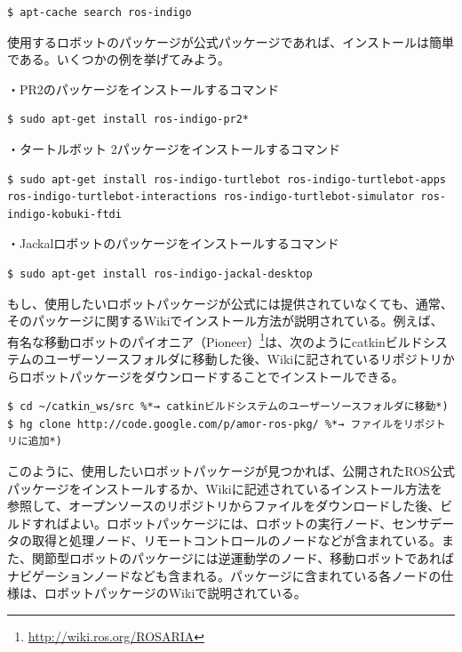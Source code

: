 \begin{lstlisting}[language=ROS]
$ apt-cache search ros-indigo
\end{lstlisting}

使用するロボットのパッケージが公式パッケージであれば、インストールは簡単である。いくつかの例を挙げてみよう。
\vspace{\baselineskip}

・PR2のパッケージをインストールするコマンド
\begin{lstlisting}[language=ROS]
$ sudo apt-get install ros-indigo-pr2*
\end{lstlisting}

・タートルボット 2パッケージをインストールするコマンド
\begin{lstlisting}[language=ROS]
$ sudo apt-get install ros-indigo-turtlebot ros-indigo-turtlebot-apps ros-indigo-turtlebot-interactions ros-indigo-turtlebot-simulator ros-indigo-kobuki-ftdi
\end{lstlisting}

・Jackalロボットのパッケージをインストールするコマンド
\begin{lstlisting}[language=ROS]
$ sudo apt-get install ros-indigo-jackal-desktop
\end{lstlisting}

もし、使用したいロボットパッケージが公式には提供されていなくても、通常、そのパッケージに関するWikiでインストール方法が説明されている。例えば、有名な移動ロボットのパイオニア（Pioneer）\footnote{\url{http://wiki.ros.org/ROSARIA}}は、次のようにcatkinビルドシステムのユーザーソースフォルダに移動した後、Wikiに記されているリポジトリからロボットパッケージをダウンロードすることでインストールできる。

\begin{lstlisting}[language=ROS]
$ cd ~/catkin_ws/src %*→ catkinビルドシステムのユーザーソースフォルダに移動*)
$ hg clone http://code.google.com/p/amor-ros-pkg/ %*→ ファイルをリポジトリに追加*)
\end{lstlisting}

このように、使用したいロボットパッケージが見つかれば、公開されたROS公式パッケージをインストールするか、Wikiに記述されているインストール方法を参照して、オープンソースのリポジトリからファイルをダウンロードした後、ビルドすればよい。ロボットパッケージには、ロボットの実行ノード、センサデータの取得と処理ノード、リモートコントロールのノードなどが含まれている。また、関節型ロボットのパッケージには逆運動学のノード、移動ロボットであればナビゲーションノードなども含まれる。パッケージに含まれている各ノードの仕様は、ロボットパッケージのWikiで説明されている。

